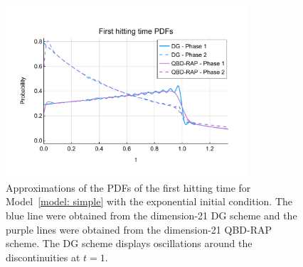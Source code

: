 \begin{figure}[h]
	\centering 
	\includegraphics[width=0.8\textwidth,trim={0cm 1.25cm 0cm 1.25cm},clip]{chapter6/figs/hitting_times_model/hitting_times/exp/pdf_order21.pdf}%
	\caption{Approximations of the PDFs of the first hitting time for Model~\ref{model: simple} with the exponential initial condition. The blue line were obtained from the dimension-21 DG scheme and the purple lines were obtained from the dimension-21 QBD-RAP scheme. The DG scheme displays oscillations around the discontinuities at \(t=1\). } 
	\label{fig: hitting time oscillation exp} 
\end{figure}
\exampleFloatBarrier
